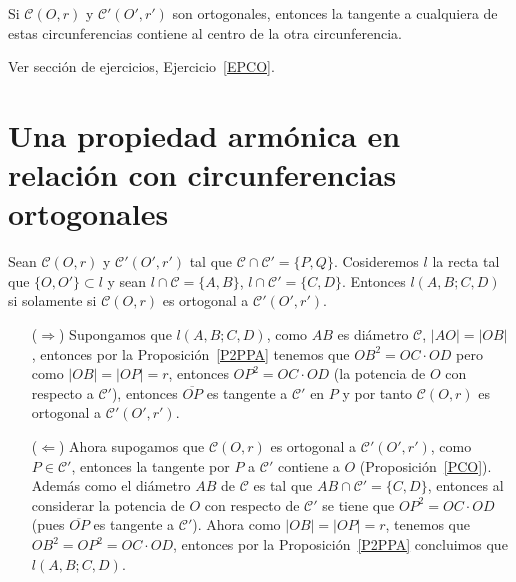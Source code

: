 \begin{prop}\label{PCO}
Si $\mathcal{C}(O,r)$ y $\mathcal{C'}(O',r')$ son ortogonales, entonces la tangente a cualquiera de estas circunferencias contiene al centro de la otra circunferencia. 
\end{prop}
\begin{pba}
Ver sección de ejercicios, Ejercicio~\ref{EPCO}.
\end{pba}
\section{Una propiedad armónica en relación con circunferencias ortogonales}
\begin{teo}
Sean $\mathcal{C}(O,r)$ y $\mathcal{C'}(O',r')$ tal que $\mathcal{C}\cap\mathcal{C'}=\{P,Q\}$. Cosideremos $l$ la recta tal que $\{O,O'\}\subset l$ y sean $l\cap\mathcal{C}=\{A,B\}$, $l\cap\mathcal{C'}=\{C,D\}$. Entonces $l(A,B;C,D)$ si solamente si $\mathcal{C}(O,r)$ es ortogonal a $\mathcal{C'}(O',r')$.
\end{teo}
\begin{dem}
\begin{enumerate}
\item [($\Rightarrow$)] Supongamos que $l(A,B;C,D)$, como $AB$ es diámetro $\mathcal{C}$, $|AO|=|OB|~$, entonces por la Proposición~\ref{P2PPA} tenemos que $OB^{2}=OC\cdot OD$ pero como $|OB|=|OP|=r$, entonces $OP^{2}=OC\cdot OD$ (la potencia de $O$ con respecto a $\mathcal{C'}$), entonces $\overline{OP}$ es tangente a $\mathcal{C'}$ en $P$ y por tanto $\mathcal{C}(O,r)$ es ortogonal a $\mathcal{C'}(O',r')$.
\item [($\Leftarrow$)] Ahora supogamos que $\mathcal{C}(O,r)$ es ortogonal a $\mathcal{C'}(O',r')$, como $P\in\mathcal{C'}$, entonces la tangente por $P$ a $\mathcal{C'}$ contiene a $O$ (Proposición~\ref{PCO}). Además como el diámetro $AB$ de $\mathcal{C}$ es tal que $AB\cap\mathcal{C'}=\{C,D\}$, entonces al considerar la potencia de $O$ con respecto de $\mathcal{C'}$ se tiene que $OP^{2}=OC\cdot OD$ (pues $\overline{OP}$ es tangente a $\mathcal{C'}$). Ahora como $|OB|=|OP|=r$, tenemos que $OB^{2}=OP^{2}=OC\cdot OD$, entonces por la Proposición~\ref{P2PPA} concluimos que $l(A,B;C,D)$.
\end{enumerate}
\end{dem}
